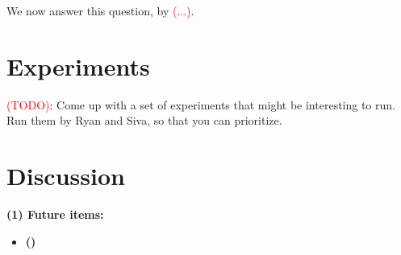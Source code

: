\documentclass{article}
\newcommand{\1}{\mathbf{1}}
\theoremstyle{alden}
\theoremstyle{aldenthm}
\theoremstyle{definition}
\theoremstyle{remark}
\begin{document}
We now answer this question, by \textcolor{red}{(...)}.

\section{Experiments}
\label{sec:experiments}

\textcolor{red}{(TODO)}: Come up with a set of experiments that might be interesting to run. Run them by Ryan and Siva, so that you can prioritize.

\section{Discussion}
\label{sec:discussion}

\textbf{(1) Future items:}
\begin{itemize}
	\item \textbf{()}
\end{itemize}



 

\appendix


\end{document}
